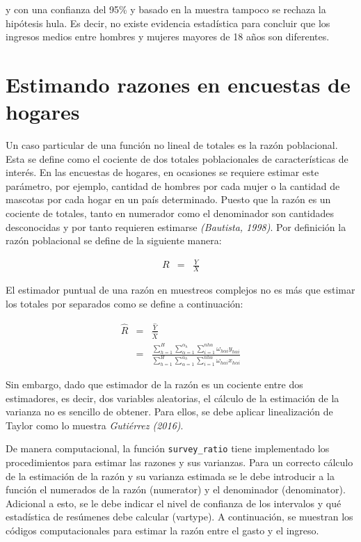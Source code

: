 \documentclass[
  12pt,
]{book}
\begin{document}
y con una confianza del 95\% y basado en la muestra tampoco se rechaza la hipótesis hula. Es decir, no existe evidencia estadística para concluir que los ingresos medios entre hombres y mujeres mayores de 18 años son diferentes.

\hypertarget{estimando-razones-en-encuestas-de-hogares}{%
\section{Estimando razones en encuestas de hogares}\label{estimando-razones-en-encuestas-de-hogares}}

Un caso particular de una función no lineal de totales es la razón poblacional. Esta se define como el cociente de dos totales poblacionales de características de interés. En las encuestas de hogares, en ocasiones se requiere estimar este parámetro, por ejemplo, cantidad de hombres por cada mujer o la cantidad de mascotas por cada hogar en un país determinado. Puesto que la razón es un cociente de totales, tanto en numerador como el denominador son cantidades desconocidas y por tanto requieren estimarse \emph{(Bautista, 1998)}. Por definición la razón poblacional se define de la siguiente manera:

\begin{eqnarray*}
R & = & \frac{Y}{X}
\end{eqnarray*}

El estimador puntual de una razón en muestreos complejos no es más que estimar los totales por separados como se define a continuación:

\begin{eqnarray*}
\hat{R} & = & \frac{\hat{Y}}{\hat{X}}\\
 & = & \frac{{\displaystyle \sum_{h=1}^{H}\sum_{\alpha=1}^{\alpha_{h}}\sum_{i=1}^{nh\alpha}}\omega_{h\alpha i}y_{h\alpha i}}{{\displaystyle \sum_{h=1}^{H}\sum_{\alpha=1}^{\alpha_{h}}\sum_{i=1}^{nh\alpha}}\omega_{h\alpha i}x_{h\alpha i}}
\end{eqnarray*}

Sin embargo, dado que estimador de la razón es un cociente entre dos estimadores, es decir, dos variables aleatorias, el cálculo de la estimación de la varianza no es sencillo de obtener. Para ellos, se debe aplicar linealización de Taylor como lo muestra \emph{Gutiérrez (2016)}.

De manera computacional, la función \texttt{survey\_ratio} tiene implementado los procedimientos para estimar las razones y sus varianzas. Para un correcto cálculo de la estimación de la razón y su varianza estimada se le debe introducir a la función el numerados de la razón (numerator) y el denominador (denominator). Adicional a esto, se le debe indicar el nivel de confianza de los intervalos y qué estadística de resúmenes debe calcular (vartype). A continuación, se muestran los códigos computacionales para estimar la razón entre el gasto y el ingreso.
\end{document}
